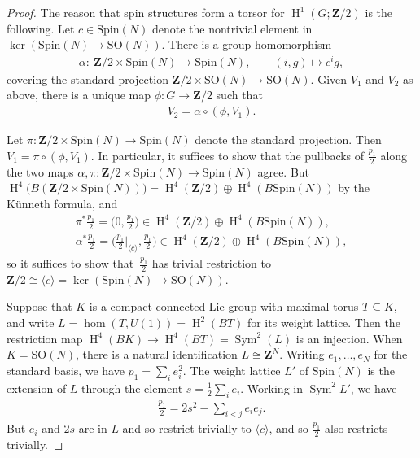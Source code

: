 \documentclass[pdftex]{sigma}
\numberwithin{equation}{section}
\newcommand\bZ{\mathbf Z}
\DeclareMathOperator\homology{H}
\renewcommand\H{\homology}
\newcommand\<\langle
\renewcommand\>\rangle
\newcommand\Spin{\mathrm{Spin}}
\newcommand\SO{\mathrm{SO}}
\DeclareMathOperator\Sym{Sym}
\begin{document}
\begin{proof} The reason that spin structures form a torsor for $\H^1(G;\bZ/2)$ is the following. Let $c \in \Spin(N)$ denote the nontrivial element in $\ker(\Spin(N) \to \SO(N))$. There is a group homomorphism
 \begin{gather*} \alpha\colon \ \bZ/2 \times \Spin(N) \to \Spin(N), \qquad (i,g) \mapsto c^i g,\end{gather*}
 covering the standard projection $\bZ/2 \times \SO(N) \to \SO(N)$.
 Given $V_1$ and $V_2$ as above, there is a unique map $\phi\colon G \to \bZ/2$ such that
 \begin{gather*} V_2 = \alpha \circ (\phi,V_1).\end{gather*}

 Let $\pi\colon \bZ/2 \times \Spin(N) \to \Spin(N)$ denote the standard projection. Then $V_1 = \pi \circ (\phi,V_1)$. In particular, it suffices to show that the pullbacks of $\frac{p_1}2$ along the two maps $\alpha,\pi\colon \bZ/2 \times \Spin(N) \to \Spin(N)$ agree. But $\H^4\big(B(\bZ/2 \times \Spin(N))\big) = \H^4(\bZ/2) \oplus \H^4(B\Spin(N))$ by the K\"unneth formula, and
 \begin{gather*} \pi^*{\tfrac{p_1}2} = \bigl(0, {\tfrac{p_1}2}\bigr) \in \H^4(\bZ/2) \oplus \H^4(B\Spin(N)), \\
 \alpha^*{\tfrac{p_1}2} = \bigl({\tfrac{p_1}2}|_{\langle c\rangle}, {\tfrac{p_1}2}\bigr) \in \H^4(\bZ/2) \oplus \H^4(B\Spin(N)),\end{gather*}
 so it suffices to show that~$\frac{p_1}2$ has trivial restriction to $\bZ/2 \cong \langle c\rangle = \ker(\Spin(N) \to \SO(N))$.

 Suppose that $K$ is a compact connected Lie group with maximal torus $T \subseteq K$, and write $L = \hom(T, U(1)) = \H^2(BT)$ for its weight lattice.
 Then the restriction map $\H^4(BK) \to \H^4(BT) = \Sym^2(L)$ is an injection.
 When $K = \SO(N)$, there is a natural identification $L \cong \bZ^N$. Writing $e_1,\dots,e_N$ for the standard basis, we have $p_1 = \sum_i e_i^2$. The weight lattice $L'$ of $\Spin(N)$ is the extension of $L$ through the element $s = \frac12 \sum_i e_i$. Working in $\Sym^2 L'$, we have
 \begin{gather*} \tfrac{p_1}2 = 2s^2 - \sum_{i<j} e_i e_j.\end{gather*}
 But $e_i$ and $2s$ are in $L$ and so restrict trivially to $\langle c \rangle$, and so $\frac{p_1}2$ also restricts trivially.
\end{proof}
\end{document}
